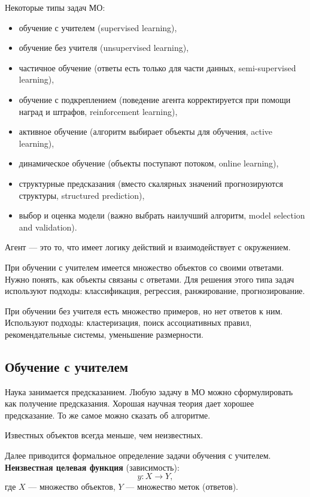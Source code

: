 Некоторые типы задач МО:
\begin{itemize}
    \item обучение с учителем (supervised learning),
    \item обучение без учителя (unsupervised learning),
    \item частичное обучение (ответы есть только для части данных,
        semi-supervised learning),
    \item обучение с подкреплением (поведение агента корректируется при помощи
        наград и штрафов, reinforcement learning),
    \item активное обучение (алгоритм выбирает объекты для обучения, active
        learning),
    \item динамическое обучение (объекты поступают потоком, online learning),
    \item структурные предсказания (вместо скалярных значений прогнозируются
        структуры, structured prediction),
    \item выбор и оценка модели (важно выбрать наилучший алгоритм, model
        selection and validation).
\end{itemize} 

Агент --- это то, что имеет логику действий и взаимодействует с окружением.

При обучении с учителем имеется множество объектов со своими ответами. Нужно
понять, как объекты связаны с ответами. Для решения этого типа задач используют
подходы: классификация, регрессия, ранжирование, прогнозирование.

При обучении без учителя есть множество примеров, но нет ответов к ним.
Используют подходы: кластеризация, поиск ассоциативных правил, рекомендательные
системы, уменьшение размерности.

\subsection{Обучение с учителем}

Наука занимается предсказанием. Любую задачу в МО можно сформулировать как
получение предсказания. Хорошая научная теория дает хорошее предсказание. То
же самое можно сказать об алгоритме.

Известных объектов всегда меньше, чем неизвестных.

Далее приводится формальное определение задачи обучения с учителем.
\textbf{Неизвестная целевая функция} (зависимость):
\[
y : X \to Y,
\] где $X$ --- множество объектов, $Y$ --- множество меток (ответов).

